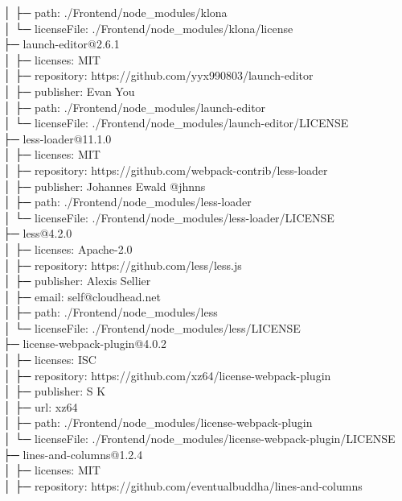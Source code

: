 \documentclass[
    paper=a4,
    twoside=false,
    parskip=half,
    listof=entryprefix,
    listof=totoc,
    index=totoc,
    bibliography=totoc,
    headsepline,
]{scrbook}
\begin{document}
    │  ├─ path: ./Frontend/node\_modules/klona\\
    │  └─ licenseFile: ./Frontend/node\_modules/klona/license\\
    ├─ launch-editor@2.6.1\\
    │  ├─ licenses: MIT\\
    │  ├─ repository: https://github.com/yyx990803/launch-editor\\
    │  ├─ publisher: Evan You\\
    │  ├─ path: ./Frontend/node\_modules/launch-editor\\
    │  └─ licenseFile: ./Frontend/node\_modules/launch-editor/LICENSE\\
    ├─ less-loader@11.1.0\\
    │  ├─ licenses: MIT\\
    │  ├─ repository: https://github.com/webpack-contrib/less-loader\\
    │  ├─ publisher: Johannes Ewald @jhnns\\
    │  ├─ path: ./Frontend/node\_modules/less-loader\\
    │  └─ licenseFile: ./Frontend/node\_modules/less-loader/LICENSE\\
    ├─ less@4.2.0\\
    │  ├─ licenses: Apache-2.0\\
    │  ├─ repository: https://github.com/less/less.js\\
    │  ├─ publisher: Alexis Sellier\\
    │  ├─ email: self@cloudhead.net\\
    │  ├─ path: ./Frontend/node\_modules/less\\
    │  └─ licenseFile: ./Frontend/node\_modules/less/LICENSE\\
    ├─ license-webpack-plugin@4.0.2\\
    │  ├─ licenses: ISC\\
    │  ├─ repository: https://github.com/xz64/license-webpack-plugin\\
    │  ├─ publisher: S K\\
    │  ├─ url: xz64\\
    │  ├─ path: ./Frontend/node\_modules/license-webpack-plugin\\
    │  └─ licenseFile: ./Frontend/node\_modules/license-webpack-plugin/LICENSE\\
    ├─ lines-and-columns@1.2.4\\
    │  ├─ licenses: MIT\\
    │  ├─ repository: https://github.com/eventualbuddha/lines-and-columns\\
\end{document}
